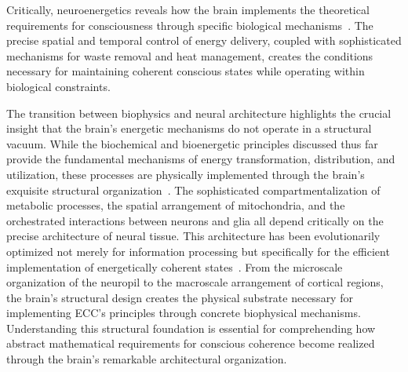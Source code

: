 Critically, neuroenergetics reveals how the brain implements the theoretical requirements for consciousness through specific biological mechanisms~\cite{Hertz2007, Hameroff2014}. The precise spatial and temporal control of energy delivery, coupled with sophisticated mechanisms for waste removal and heat management, creates the conditions necessary for maintaining coherent conscious states while operating within biological constraints.

The transition between biophysics and neural architecture highlights the crucial insight that the brain's energetic mechanisms do not operate in a structural vacuum. While the biochemical and bioenergetic principles discussed thus far provide the fundamental mechanisms of energy transformation, distribution, and utilization, these processes are physically implemented through the brain's exquisite structural organization~\cite{Sporns2011, Hilgetag2020}. The sophisticated compartmentalization of metabolic processes, the spatial arrangement of mitochondria, and the orchestrated interactions between neurons and glia all depend critically on the precise architecture of neural tissue. This architecture has been evolutionarily optimized not merely for information processing but specifically for the efficient implementation of energetically coherent states~\cite{bullmore2012economy, Bassett2017}. From the microscale organization of the neuropil to the macroscale arrangement of cortical regions, the brain's structural design creates the physical substrate necessary for implementing ECC's principles through concrete biophysical mechanisms. Understanding this structural foundation is essential for comprehending how abstract mathematical requirements for conscious coherence become realized through the brain's remarkable architectural organization.
